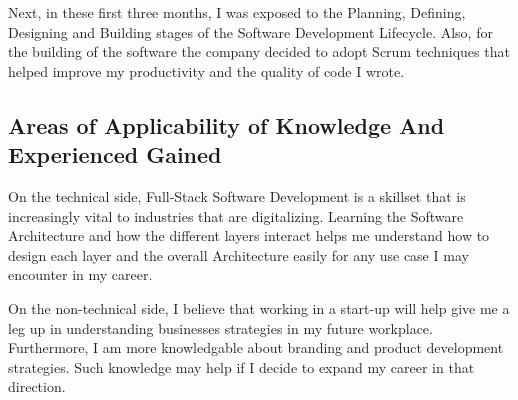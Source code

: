 \noindent
Next, in these first three months, I was exposed to the Planning, Defining, Designing and Building stages of the Software Development Lifecycle. Also, for the building of the software the company decided to adopt Scrum techniques that
helped improve my productivity and the quality of code I wrote.


\subsection{Areas of Applicability of Knowledge And Experienced Gained}
\noindent
On the technical side, Full-Stack Software Development is a skillset that is increasingly vital to industries that are digitalizing. Learning the Software Architecture and how the different layers interact helps me understand how to design each layer and the overall
Architecture easily for any use case I may encounter in my career.

\noindent
On the non-technical side, I believe that working in a start-up will help give me a leg up in understanding businesses strategies in my future workplace. Furthermore, I am more knowledgable about branding and product development strategies. Such knowledge may help if I decide to expand my career
in that direction.
